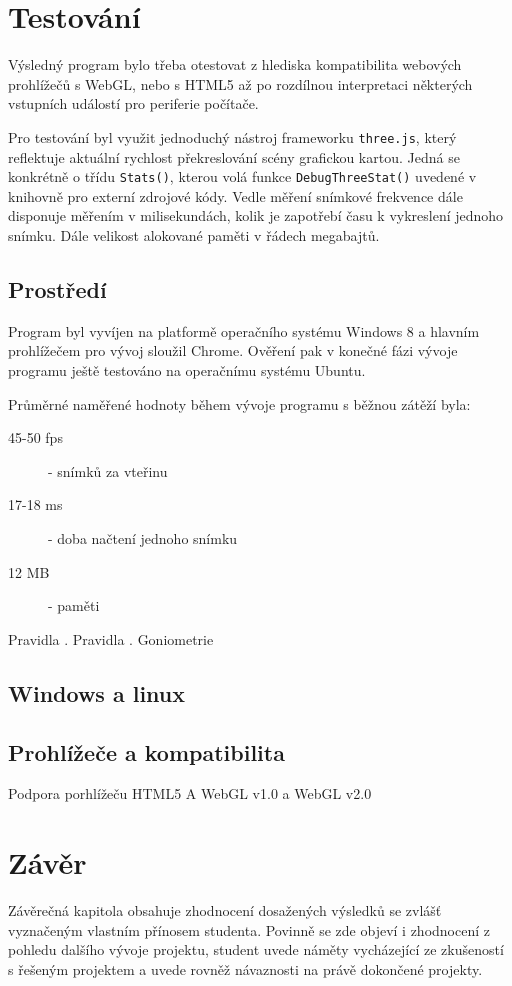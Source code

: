 \newpage

\chapter{Testování}
\label{chapter:5}
Výsledný program bylo třeba otestovat z  hlediska kompatibilita webových prohlížečů  s WebGL, nebo s HTML5 až po rozdílnou interpretaci některých vstupních událostí pro periferie počítače. 

Pro testování byl využit jednoduchý nástroj frameworku \texttt{three.js}, který reflektuje aktuální rychlost překreslování scény grafickou kartou. Jedná se konkrétně o třídu \texttt{Stats()}, kterou volá funkce \texttt{DebugThreeStat()} uvedené v knihovně pro externí zdrojové kódy. Vedle měření snímkové frekvence dále disponuje měřením v milisekundách, kolik je zapotřebí času k vykreslení jednoho snímku. Dále velikost alokované paměti v řádech megabajtů.

\section*{Prostředí}
Program byl vyvíjen na platformě operačního systému Windows 8 a hlavním prohlížečem pro vývoj sloužil Chrome. Ověření pak v konečné fázi vývoje programu ještě testováno na operačnímu systému Ubuntu.

Průměrné naměřené  hodnoty  během vývoje programu s běžnou zátěží byla:
\begin{description}
	\item[45-50 fps] - snímků za vteřinu
	\item[17-18 ms] - doba načtení jednoho snímku
	\item[12 MB] - paměti
\end{description}

Pravidla \cite{Kompendium}. Pravidla \cite{Goniometrie}. 
Goniometrie



\section{Windows a linux}
\section{Prohlížeče a kompatibilita}
Podpora porhlížeču HTML5 A WebGL v1.0 a WebGL v2.0

\chapter{Závěr}
\label{chapter:6}

Závěrečná kapitola obsahuje zhodnocení dosažených výsledků se zvlášť vyznačeným vlastním přínosem studenta. Povinně se zde objeví i zhodnocení z pohledu dalšího vývoje projektu, student uvede náměty vycházející ze zkušeností s řešeným projektem a uvede rovněž návaznosti na právě dokončené projekty.

